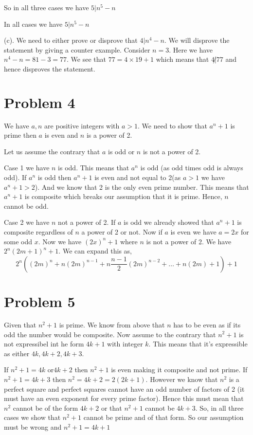 \documentclass[a4paper]{report}
\begin{document}
 So in all three cases we have $5 | n^{5} - n$





In all cases we have $5 | n^{5} - n$

(c). We need to either prove or disprove that $4 | n^{4} - n$. We will disprove the statement by giving a counter example. Consider $n = 3$. Here we have  $n^{4} - n = 81 - 3 = 77$. We see that $77 = 4 \times 19 + 1$ which means that $4 \not | 77 $ and hence disproves the statement.



\section*{Problem 4}

We have $a, n$ are positive integers with  $a > 1$. We need to show that  $a^{n} + 1$ is prime then $a$ is even and $n$ is a power of 2.

Let us assume the contrary that $a$ is odd or $n$ is not a power of 2. 

Case 1 we have $n$ is odd. This means that $a^{n}$ is odd (as odd times odd is always odd). If $a^{n}$ is odd then $a^{n} + 1$ is even and not equal to 2(as $a > 1$ we have $a^{n} + 1 > 2$). And we know that 2 is the only even prime number. This means that $a^{n} + 1$ is composite which breaks our assumption that it is prime. Hence, $n$ cannot be odd.

Case 2 we have $n$ not a power of 2. If $a$ is odd we already showed that $a^{n} + 1$ is composite regardless of $n$ a power of 2 or not. Now if $a$ is even we have $a = 2x$ for some odd  $x$. Now we have  $(2x)^{n} + 1$ where $n$ is not a power of 2. We have $2^{n}(2m + 1)^{n} + 1$. We can expand this as, 
$$ 2^{n}( (2m)^{n} + n (2m)^{n - 1} + n\frac{n - 1}{2}(2m)^{n - 2} + \dots + n (2m) + 1) + 1 $$ 


\section*{Problem 5}

    Given that $n^2 + 1$ is prime. We know from above that $n$ has to be even as if its odd the number would be composite. Now assume to the contrary that $n^2 + 1$  is not expressibel int he form $4k + 1$ with integer $k$. This means that it's expressible as either  $4k, 4k + 2, 4k + 3$.

    If $n^2 + 1 = 4k$ or$ 4k + 2$ then $n^2 + 1$ is even making it composite and not prime. If $n^2 + 1 = 4k + 3 $  then $n^2 = 4k  + 2 = 2(2k + 1)$. However we know that $n^2$ is a perfect square and perfect squares cannot have an odd number of factors of 2  (it must have an even exponent for every prime factor). Hence this must mean that $n^2$ cannot be of the form $4k + 2$ or that  $n^2 + 1$ cannot be $4k + 3$. So, in all three cases we show that  $n^2 + 1$ cannot be prime and of that form. So our assumption must be wrong and $n^2 + 1 = 4k + 1$
\end{document}
